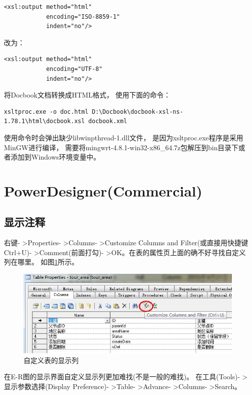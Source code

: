 \documentclass{book}
\begin{document}
\begin{lstlisting}
<xsl:output method="html"
            encoding="ISO-8859-1"
            indent="no"/>
\end{lstlisting}

改为：

\begin{lstlisting}
<xsl:output method="html"
            encoding="UTF-8"
            indent="no"/>
\end{lstlisting}

将Docbook文档转换成HTML格式，
使用下面的命令：

\begin{lstlisting}
xsltproc.exe -o doc.html D:\Docbook\docbook-xsl-ns-1.78.1\html\docbook.xsl docbook.xml
\end{lstlisting}

使用命令时会弹出缺少libwinpthread-1.dll文件，
是因为xsltproc.exe程序是采用MinGW进行编译，
需要将mingwrt-4.8.1-win32-x86\_64.7z包解压到bin目录下或者添加到Windows环境变量中。

\section{PowerDesigner(Commercial)}

\subsection{显示注释}

右键- >Properties- >Columns- >Customize Columns and Filter(或直接用快捷键Ctrl+U)- >Comment(前面打勾)- >OK。在表的属性页上面的确不好寻找自定义列在哪里。
如图\ref{fig:CustomColumnsAndFilter}所示。

\begin{figure}[htbp]
	\centering
	\includegraphics[scale=0.8]{CustomColumnsAndFilter.jpg}
	\caption{自定义表的显示列}
	\label{fig:CustomColumnsAndFilter}
\end{figure}

在E-R图的显示界面自定义显示列更加难找(不是一般的难找)。
在工具(Tools)- >显示参数选择(Display Preference)- >Table- >Advance- >Columns- >Search。
\end{document}
